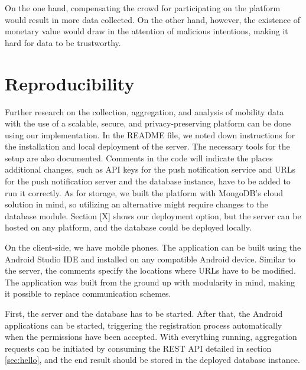 On the one hand, compensating the crowd for participating on the platform would result in more data collected. On the other hand, however, the existence of monetary value would draw in the attention of malicious intentions, making it hard for data to be trustworthy.

\section{Reproducibility}
Further research on the collection, aggregation, and analysis of mobility data with the use of a scalable, secure, and privacy-preserving platform can be done using our implementation. In the README file, we noted down instructions for the installation and local deployment of the server. The necessary tools for the setup are also documented. Comments in the code will indicate the places additional changes, such as API keys for the push notification service and URLs for the push notification server and the database instance, have to be added to run it correctly. As for storage, we built the platform with MongoDB's cloud solution in mind, so utilizing an alternative might require changes to the database module. Section [X] shows our deployment option, but the server can be hosted on any platform, and the database could be deployed locally.

On the client-side, we have mobile phones. The application can be built using the Android Studio IDE and installed on any compatible Android device. Similar to the server, the comments specify the locations where URLs have to be modified. The application was built from the ground up with modularity in mind, making it possible to replace communication schemes.

First, the server and the database has to be started. After that, the Android applications can be started, triggering the registration process automatically when the permissions have been accepted. With everything running, aggregation requests can be initiated by consuming the REST API detailed in section \ref{sec:hello}, and the end result should be stored in the deployed database instance.